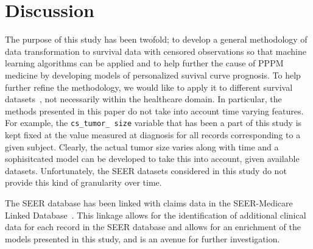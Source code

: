 \documentclass[10pt,letterpaper]{article}
\newcommand{\codewhite}[1]{\colorbox{white}{\texttt{#1}}}
\begin{document}
\section*{Discussion}
\label{sec:discussion}


The purpose of this study has been twofold; to develop a general methodology of data transformation to survival data with censored observations so that machine learning algorithms can be applied and to help further the cause of PPPM medicine by developing models of personalized suvival curve prognosis.
To help further refine the methodology, we would like to apply it to different survival datasets~\cite{umass}, not necessarily within the healthcare domain. In particular, the methods presented in this paper do not take into account time varying features. For example, the \codewhite{cs\_tumor\_ size} variable that has been a part of this study is kept fixed at the value measured at diagnosis for all records corresponding to a given subject. Clearly, the actual tumor size varies along with time and a sophisitcated model can be developed to take this into account, given available datasets. Unfortunately, the SEER datasets considered in this study do not provide this kind of granularity over time.


The SEER database has been linked with claims data in the SEER-Medicare Linked Database~\cite{seermed}. This linkage allows for the identification of additional clinical data for each record in the SEER database and allows for an enrichment of the models presented in this study, and is an avenue for further investigation.
\end{document}
